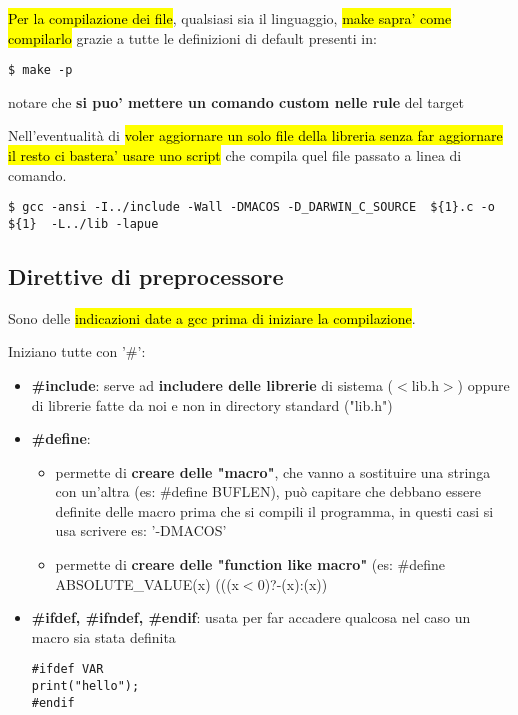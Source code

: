 \hl{Per la compilazione dei file}, qualsiasi sia il linguaggio, \hl{make sapra' come compilarlo} grazie a tutte le definizioni di default presenti in:

\begin{lstlisting}
$ make -p
\end{lstlisting}

notare che \textbf{si puo' mettere un comando custom nelle rule} del target

Nell'eventualità di \hl{voler aggiornare un solo file della libreria senza far aggiornare il resto ci bastera' usare uno script} che compila quel file passato a linea di comando.

\begin{lstlisting}
$ gcc -ansi -I../include -Wall -DMACOS -D_DARWIN_C_SOURCE  ${1}.c -o ${1}  -L../lib -lapue
\end{lstlisting}



\subsection{Direttive di preprocessore}
Sono delle \hl{indicazioni date a gcc prima di iniziare la compilazione}.

Iniziano tutte con '\#':
\begin{itemize}
	\item \textbf{\#include}: serve ad \textbf{includere delle librerie} di sistema ($<$lib.h$>$) oppure di librerie fatte da noi e non in directory standard ("lib.h")
	\item \textbf{\#define}:
		\begin{itemize}
			\item permette di \textbf{creare delle "macro"}, che vanno a sostituire una stringa con un'altra (es: \#define BUFLEN), può capitare che debbano essere definite delle macro prima che si compili il programma, in questi casi si usa scrivere es: '-DMACOS'
			\item permette di \textbf{creare delle "function like macro"} (es: \#define ABSOLUTE\_VALUE(x) (((x$<$0)?-(x):(x))  
		\end{itemize}
		
	\item \textbf{\#ifdef, \#ifndef, \#endif}: usata per far accadere qualcosa nel caso un macro sia stata definita
\begin{lstlisting}
#ifdef VAR
print("hello");
#endif
\end{lstlisting}

\end{itemize} 

